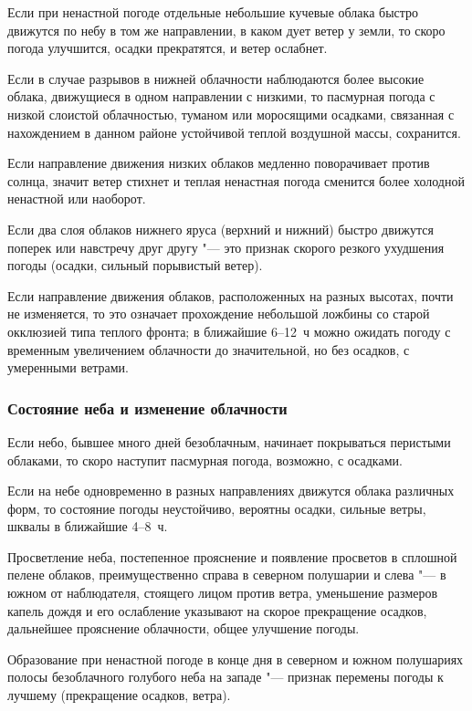  Если при ненастной погоде отдельные небольшие кучевые облака
быстро движутся по небу в том же направлении, в каком дует ветер у
земли, то скоро погода улучшится, осадки прекратятся, и ветер
ослабнет.

 Если в случае разрывов в нижней облачности наблюдаются более
высокие облака, движущиеся в одном направлении с низкими, то пасмурная
погода с низкой слоистой облачностью, туманом или моросящими осадками,
связанная с нахождением в данном районе устойчивой теплой воздушной
массы, сохранится.

 Если направление движения низких облаков медленно поворачивает
против солнца, значит ветер стихнет и теплая ненастная погода сменится
более холодной ненастной или наоборот.

 Если два слоя облаков нижнего яруса (верхний и нижний) быстро
движутся поперек или навстречу друг другу "--- это признак скорого резкого
ухудшения погоды (осадки, сильный порывистый ветер).

 Если направление движения облаков, расположенных на разных
высотах, почти не изменяется, то это означает прохождение небольшой
ложбины со старой окклюзией типа теплого фронта; в ближайшие 6--12~ч
можно ожидать погоду с временным увеличением облачности до
значительной, но без осадков, с умеренными ветрами.

\subsubsection{Состояние неба и изменение облачности}

 Если небо, бывшее много дней безоблачным, начинает покрываться
перистыми облаками, то скоро наступит пасмурная погода, возможно, с
осадками.

 Если на небе одновременно в разных направлениях движутся облака
различных форм, то состояние погоды неустойчиво, вероятны осадки,
сильные ветры, шквалы в ближайшие 4--8~ч.

 Просветление неба, постепенное прояснение и появление просветов
в сплошной пелене облаков, преимущественно справа в северном полушарии
и слева "--- в южном от наблюдателя, стоящего лицом против ветра,
уменьшение размеров капель дождя и его ослабление указывают на скорое
прекращение осадков, дальнейшее прояснение облачности, общее улучшение
погоды.

 Образование при ненастной погоде в конце дня в северном и южном
полушариях полосы безоблачного голубого неба на западе "--- признак
перемены погоды к лучшему (прекращение осадков, ветра).

